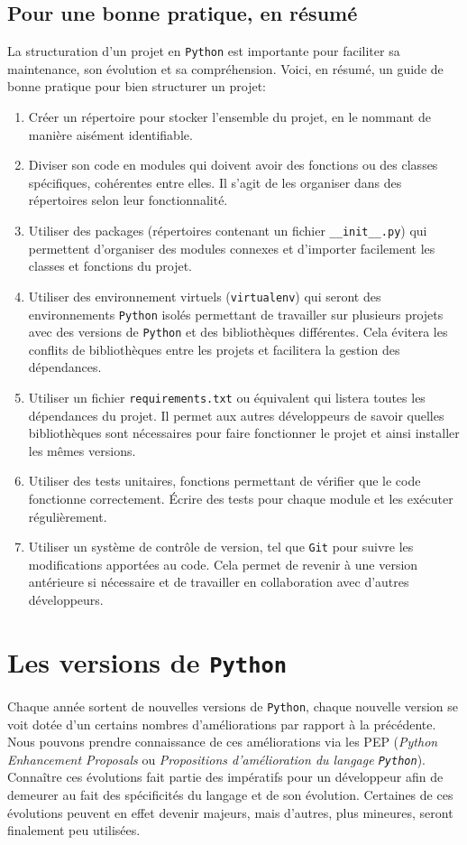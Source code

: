\documentclass[a4paper,11pt]{book}
\begin{document}
\section{Pour une bonne pratique, en résumé}
La structuration d'un projet en \texttt{Python} est importante pour faciliter sa maintenance, son évolution et sa compréhension. Voici, en résumé, un guide de bonne pratique pour bien structurer un projet:
\begin{enumerate}
	\item Créer un répertoire pour stocker l'ensemble du projet, en le nommant de manière aisément identifiable.
	\item Diviser son code en modules qui doivent avoir des fonctions ou des classes spécifiques, cohérentes entre elles. Il s'agit de les organiser dans des répertoires selon leur fonctionnalité.
	\item Utiliser des packages (répertoires contenant un fichier \texttt{\_\_init\_\_.py}) qui permettent d'organiser des modules connexes et d'importer facilement les classes et fonctions du projet.
	\item Utiliser des environnement virtuels (\texttt{virtualenv}) qui seront des environnements \texttt{Python} isolés permettant de travailler sur plusieurs projets avec des versions de \texttt{Python} et des bibliothèques différentes. Cela évitera les conflits de bibliothèques entre les projets et facilitera la gestion des dépendances.
	\item Utiliser un fichier \texttt{requirements.txt} ou équivalent qui listera toutes les dépendances du projet. Il permet aux autres développeurs de savoir quelles bibliothèques sont nécessaires pour faire fonctionner le projet et ainsi installer les mêmes versions.
	\item Utiliser des tests unitaires, fonctions permettant de vérifier que le code fonctionne correctement. Écrire des tests pour chaque module et les exécuter régulièrement.
	\item Utiliser un système de contrôle de version, tel que \texttt{Git} pour suivre les modifications apportées au code. Cela permet de revenir à une version antérieure si nécessaire et de travailler en collaboration avec d'autres développeurs.
\end{enumerate}
\medskip

\chapter{Les versions de \texttt{Python}}
Chaque année sortent de nouvelles versions de \texttt{Python}, chaque nouvelle version se voit dotée d'un certains nombres d'améliorations par rapport à la précédente. Nous pouvons prendre connaissance de ces améliorations via les PEP (\textit{Python Enhancement Proposals} ou \textit{Propositions d'amélioration du langage \texttt{Python}}). Connaître ces évolutions fait partie des impératifs pour un développeur afin de demeurer au fait des spécificités du langage et de son évolution. Certaines de ces évolutions peuvent en effet devenir majeurs, mais d'autres, plus mineures, seront finalement peu utilisées.
\medskip
\end{document}
